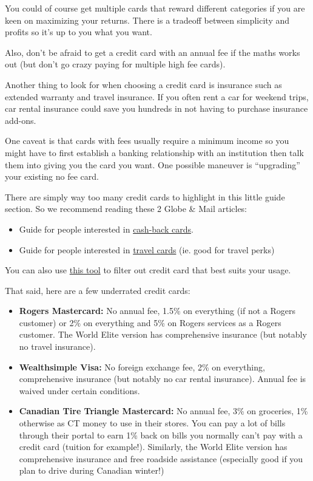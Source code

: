 You could of course get multiple cards that reward different categories if you are keen on maximizing your returns. There is a tradeoff between simplicity and profits so it's up to you what you want.

Also, don't be afraid to get a credit card with an annual fee if the maths works out (but don't go crazy paying for multiple high fee cards). 

Another thing to look for when choosing a credit card is insurance such as extended warranty and travel insurance. If you often rent a car for weekend trips, car rental insurance could save you hundreds in not having to purchase insurance add-ons.

One caveat is that cards with fees usually require a minimum income so you might have to first establish a banking relationship with an institution then talk them into giving you the card you want. One possible maneuver is “upgrading” your existing no fee card.

There are simply way too many credit cards to highlight in this little guide section. So we recommend reading these 2 Globe \& Mail articles:
\begin{itemize}
    \item Guide for people interested in \href{https://www.theglobeandmail.com/business/article-cash-back-credit-cards-guide-canada/?utm_medium=RedditAd%20and%20utm_campaign=traffic_mkt}{cash-back cards}.
    \item Guide for people interested in \href{https://www.theglobeandmail.com/business/article-travel-credit-cards-guide-canada/?utm_medium=RedditAd%20and%20utm_campaign=traffic_mkt}{travel cards} (ie. good for travel perks)
\end{itemize}

You can also use \href{https://www.finlywealth.com/credit-cards/compare}{this tool} to filter out credit card that best suits your usage.

That said, here are a few underrated credit cards:
\begin{itemize}
    \item \textbf{Rogers Mastercard:} No annual fee, 1.5\% on everything (if not a Rogers customer) or 2\% on everything and 5\% on Rogers services as a Rogers customer. The World Elite version has comprehensive insurance (but notably no travel insurance).
    \item \textbf{Wealthsimple Visa:} No foreign exchange fee, 2\% on everything, comprehensive insurance (but notably no car rental insurance). Annual fee is waived under certain conditions. 
    \item \textbf{Canadian Tire Triangle Mastercard:} No annual fee, 3\% on groceries, 1\% otherwise as CT money to use in their stores. You can pay a lot of bills through their portal to earn 1\% back on bills you normally can't pay with a credit card (tuition for example!). Similarly, the World Elite version has comprehensive insurance and free roadside assistance (especially good if you plan to drive during Canadian winter!) 

\end{itemize}

